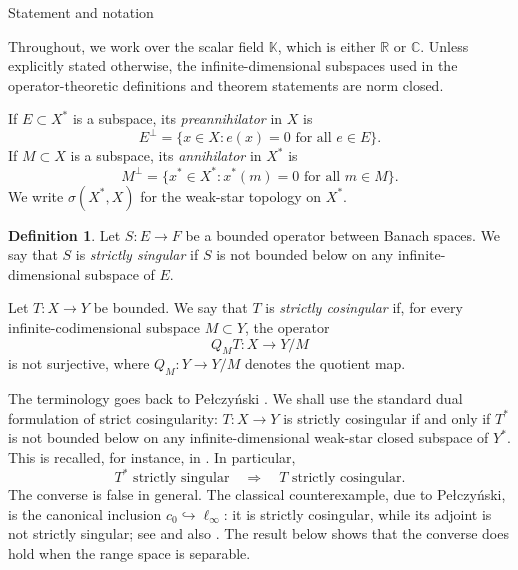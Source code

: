 \documentclass[11pt,reqno]{amsart}
\makeatletter
\theoremstyle{plain}
\theoremstyle{definition}
\newtheorem{definition}[definition]{Definition}
\newcommand{\R}{\mathbb R}
\newcommand{\C}{\mathbb C}
\newcounter{problempaper}
\newenvironment{problempaperbody}{%
  \setcounter{subsection}{0}%
  \setcounter{subsubsection}{0}%
  \setcounter{paragraph}{0}%
  \renewcommand{\thesubsection}{\arabic{subsection}}%
  \renewcommand{\thesubsubsection}{\thesubsection.\arabic{subsubsection}}%
  \renewcommand{\theparagraph}{\thesubsubsection.\arabic{paragraph}}%
  \let\problem@outersection\section
  \let\problem@outersubsection\subsection
  \let\problem@outersubsubsection\subsubsection
  \let\problem@outerparagraph\paragraph
  \let\section\problem@papersection
  \let\subsection\problem@papersubsection
  \let\subsubsection\problem@papersubsubsection
}{%
  \let\section\problem@outersection
  \let\subsection\problem@outersubsection
  \let\subsubsection\problem@outersubsubsection
  \let\paragraph\problem@outerparagraph
}
\newcommand{\problem@target}[2]{%
  \hypertarget{problem-\theproblempaper-#1-#2}{}%
}
\newcommand{\problem@paperheading}[3]{%
  \par\bigskip
  \problem@target{#1}{#2}%
  \noindent{\large\bfseries #2.\quad #3\par}%
  \nobreak\smallskip
}
\newcommand{\problem@papersubheading}[3]{%
  \par\medskip
  \problem@target{#1}{#2}%
  \noindent{\normalsize\bfseries #2.\quad #3\par}%
  \nobreak\smallskip
}
\newcommand{\problem@papersubsubheading}[3]{%
  \par\smallskip
  \problem@target{#1}{#2}%
  \noindent{\normalsize\itshape #2.\quad #3.\ }%
}
\def\problem@papersection{%
  \@ifstar{\problem@papersectionstar}{\problem@papersectionnostar}%
}
\def\problem@papersectionstar#1{%
  \par\bigskip\noindent{\large\bfseries #1\par}\nobreak\smallskip
}
\def\problem@papersectionnostar#1{%
  \refstepcounter{subsection}%
  \setcounter{subsubsection}{0}%
  \setcounter{paragraph}{0}%
  \problem@paperheading{section}{\thesubsection}{#1}%
  \problem@writecontentsline{section}{\thesubsection}{#1}%
}
\def\problem@papersubsection{%
  \@ifstar{\problem@papersubsectionstar}{\problem@papersubsectionnostar}%
}
\def\problem@papersubsectionstar#1{%
  \par\medskip\noindent{\normalsize\bfseries #1\par}\nobreak\smallskip
}
\def\problem@papersubsectionnostar#1{%
  \refstepcounter{subsubsection}%
  \setcounter{paragraph}{0}%
  \problem@papersubheading{subsection}{\thesubsubsection}{#1}%
  \problem@writecontentsline{subsection}{\thesubsubsection}{#1}%
}
\def\problem@papersubsubsection{%
  \@ifstar{\problem@papersubsubsectionstar}{\problem@papersubsubsectionnostar}%
}
\def\problem@papersubsubsectionstar#1{%
  \par\smallskip\noindent{\normalsize\itshape #1.\ }%
}
\def\problem@papersubsubsectionnostar#1{%
  \refstepcounter{paragraph}%
  \problem@papersubsubheading{subsubsection}{\theparagraph}{#1}%
  \problem@writecontentsline{subsubsection}{\theparagraph}{#1}%
}
\newcommand{\problem@writecontentsline}[3]{%
  \begingroup
  \protected@write\@auxout{}{%
    \string\problemcontentsentry{\theproblempaper}{#1}{#2}{#3}{\thepage}%
  }%
  \endgroup
}
\newcommand{\problemcontentsentry}[5]{%
  \@ifundefined{problemcontents@#1}{%
    \expandafter\gdef\csname problemcontents@#1\endcsname{}%
  }{}%
  \expandafter\g@addto@macro\csname problemcontents@#1\endcsname{%
    \problemcontentsline{#1}{#2}{#3}{#4}{#5}%
  }%
}
\newcommand{\problemcontentslink}[4]{%
  \hyperlink{problem-#1-#2-#3}{#4}%
}
\newcommand{\problemcontentsline}[5]{%
  \ifstrequal{#2}{section}{%
    \par\noindent
    \problemcontentslink{#1}{#2}{#3}{\makebox[2.5em][l]{#3}#4}%
    \nobreak\dotfill
    \problemcontentslink{#1}{#2}{#3}{#5}\par
  }{%
    \ifstrequal{#2}{subsection}{%
      \par\noindent\hspace*{1.5em}%
      \problemcontentslink{#1}{#2}{#3}{\makebox[3.5em][l]{#3}#4}%
      \nobreak\dotfill
      \problemcontentslink{#1}{#2}{#3}{#5}\par
    }{%
      \par\noindent\hspace*{3em}%
      \problemcontentslink{#1}{#2}{#3}{\makebox[4.5em][l]{#3}#4}%
      \nobreak\dotfill
      \problemcontentslink{#1}{#2}{#3}{#5}\par
    }%
  }%
}
\makeatother
\begin{document}
\begin{problempaperbody}

\section{Statement and notation}
\label{p4:sec:statement}

Throughout, we work over the scalar field $\mathbb K$, which is either $\R$ or $\C$. Unless explicitly stated otherwise, the infinite-dimensional subspaces used in the operator-theoretic definitions and theorem statements are norm closed.

If $E\subset X^*$ is a subspace, its \emph{preannihilator} in $X$ is
\begin{equation*}
        E^\perp=\{x\in X:e(x)=0\text{ for all }e\in E\}.
\end{equation*}
If $M\subset X$ is a subspace, its \emph{annihilator} in $X^*$ is
\begin{equation*}
        M^\perp=\{x^*\in X^*:x^*(m)=0\text{ for all }m\in M\}.
\end{equation*}
We write $\sigma(X^*,X)$ for the weak-star topology on $X^*$.

\begin{definition}
\label{p4:def:strictly-singular-cosingular}
Let $S \colon E\to F$ be a bounded operator between Banach spaces. We say that $S$ is \emph{strictly singular} if $S$ is not bounded below on any infinite-dimensional subspace of $E$.

Let $T \colon X\to Y$ be bounded. We say that $T$ is \emph{strictly cosingular} if, for every infinite-codimensional subspace $M\subset Y$, the operator
\begin{equation*}
        Q_M T \colon X\to Y/M
\end{equation*}
is not surjective, where $Q_M:Y\to Y/M$ denotes the quotient map.
\end{definition}

The terminology goes back to Pe{\l}czy\'nski \cite{Pelczynski1965}. We shall use the standard dual formulation of strict cosingularity: $T \colon X\to Y$ is strictly cosingular if and only if $T^*$ is not bounded below on any infinite-dimensional weak-star closed subspace of $Y^*$. This is recalled, for instance, in \cite[Section~3]{AndroulakisBeanland2008}. In particular,
\begin{equation*}
        T^*\text{ strictly singular}\quad\Longrightarrow\quad T\text{ strictly cosingular}.
\end{equation*}
The converse is false in general. The classical counterexample, due to Pe{\l}czy\'nski, is the canonical inclusion $c_0\hookrightarrow \ell_\infty$: it is strictly cosingular, while its adjoint is not strictly singular; see \cite{Pelczynski1965} and also \cite[Section~3]{AndroulakisBeanland2008}. The result below shows that the converse does hold when the range space is separable.


\end{problempaperbody}
\end{document}
